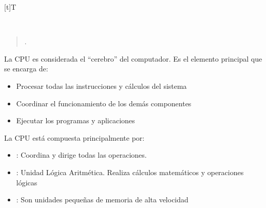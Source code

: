 \documentclass[letterpaper,10pt,spanish]{sphinxmanual}
\let\sphinxpxdimen\pdfpxdimen\else\newdimen\sphinxpxdimen
\begin{document}
\begin{savenotes}\sphinxattablestart
\sphinxthistablewithglobalstyle
\centering
\begin{tabulary}{\linewidth}[t]{T}
\sphinxtoprule
\sphinxtableatstartofbodyhook

\begin{sphinxfigure-in-table}
\centering
\capstart
\noindent\sphinxincludegraphics[width=300\sphinxpxdimen]{{image0114}.png}
\label{\detokenize{1_guias/8logica/G821:id13}}\end{sphinxfigure-in-table}\relax
\\
\sphinxbottomrule
\end{tabulary}
\sphinxtableafterendhook\par
\sphinxattableend\end{savenotes}
\begin{quote}

\sphinxAtStartPar
{}.
\end{quote}

\sphinxAtStartPar
\sphinxfootnotemark[1] La CPU es considerada el “cerebro” del computador. Es el elemento principal que se encarga de:
\begin{itemize}
\item {} 
\sphinxAtStartPar
Procesar todas las instrucciones y cálculos del sistema

\item {} 
\sphinxAtStartPar
Coordinar el funcionamiento de los demás componentes

\item {} 
\sphinxAtStartPar
Ejecutar los programas y aplicaciones

\end{itemize}

\sphinxAtStartPar
La CPU está compuesta principalmente por:
\begin{itemize}
\item {} 
\sphinxAtStartPar
{}: Coordina y dirige todas las operaciones.

\item {} 
\sphinxAtStartPar
{}: Unidad Lógica Aritmética. Realiza cálculos matemáticos y operaciones lógicas

\item {} 
\sphinxAtStartPar
{}: Son unidades pequeñas de memoria de alta velocidad

\end{itemize}
\end{document}
